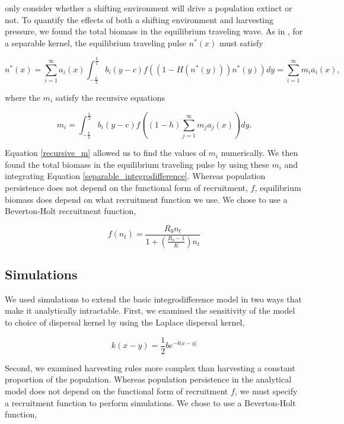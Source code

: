 \documentclass[12pt,english]{article}
\begin{document}
\begin{spacing}{1.9}
\begin{flushleft}
\citet{ZhouKot2011} only consider whether a shifting environment will drive a population extinct or not.  To quantify the effects of both a shifting environment and harvesting pressure, we found the total biomass in the equilibrium traveling wave. As in \citet{Latore:1998fk}, for a separable kernel, the equilibrium traveling pulse $n^*(x)$ must satisfy

\begin{equation}
n^*(x)=\sum^\infty_{i=1}
a_i(x)\int^{\frac{L}{2}}_{-\frac{L}{2}}b_i(y-c)f((1-H(n^*(y)))n^*(y))dy=\sum^\infty_{i=1}m_ia_i(x), \label{separable_integrodifference}
\end{equation}

\noindent where the $m_i$ satisfy the recursive equations

\begin{equation}
m_i=\int^{\frac{L}{2}}_{-\frac{L}{2}}b_i(y-c)f\left((1-h)\sum^\infty_{j=1}m_ja_j(x)\right)
dy. \label{recursive_m}
\end{equation}

\noindent Equation \ref{recursive_m} allowed us to find the values of $m_i$ numerically. We then found the total biomass in the 
equilibrium traveling pulse by using these $m_i$ and integrating Equation \ref{separable_integrodifference}.  Whereas population persistence does not depend on the functional form of recruitment, $f$, equilibrium biomass does depend on what recruitment function we use.  We chose to use a Beverton-Holt recruitment function,

\[f(n_t)=\frac{R_0n_t}{1+\left(\frac{R_0-1}{K}\right)n_t}\]


\subsection{Simulations }

We used simulations to extend the basic integrodifference model in two ways that make it analytically 
intractable. First, we examined the sensitivity of the model to choice of dispersal kernel by using the Laplace 
dispersal kernel, 

\[ k(x-y)=\frac{1}{2}be^{-b|x-y|}\]

\noindent Second, we examined harvesting rules more complex than harvesting a constant proportion of the population. Whereas population persistence in the analytical model does not depend on the functional form of recruitment $f$, we must specify a recruitment function to perform simulations.  We chose to use a Beverton-Holt function,


\end{flushleft}
\end{spacing}
\end{document}
